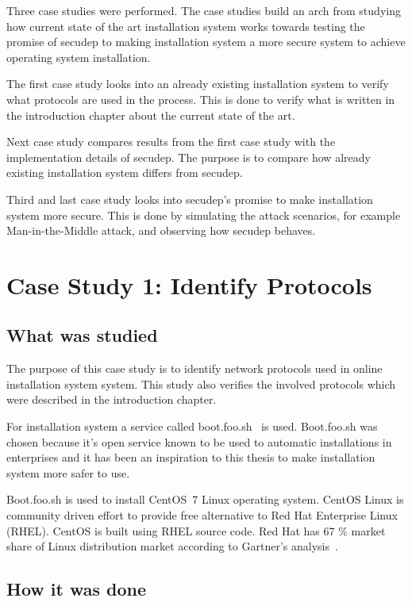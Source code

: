 
Three case studies were performed. The case studies build an arch from
studying how current state of the art installation system works
towards testing the promise of secudep to making installation system a
more secure system to achieve operating system installation.

The first case study looks into an already existing installation
system to verify what protocols are used in the process. This is done
to verify what is written in the introduction chapter about the
current state of the art.

Next case study compares results from the first case study with the
implementation details of secudep. The purpose is to compare how
already existing installation system differs from secudep.

Third and last case study looks into secudep's promise to make
installation system more secure. This is done by simulating the attack
scenarios, for example Man-in-the-Middle attack, and observing how
secudep behaves.


\section{Case Study 1: Identify Protocols}
\label{sec:casestudy1}

\subsection{What was studied}

The purpose of this case study is to identify network protocols used
in online installation system system. This study also verifies the
involved protocols which were described in the introduction chapter.

For installation system a service called
boot.foo.sh~\cite{boot-foo-sh} is used. Boot.foo.sh was chosen because
it's open service known to be used to automatic installations in
enterprises and it has been an inspiration to this thesis to make
installation system more safer to use.

Boot.foo.sh is used to install CentOS~7 Linux operating system. CentOS
Linux is community driven effort to provide free alternative to Red
Hat Enterprise Linux (RHEL). CentOS is built using RHEL source
code. Red Hat has 67 \% market share of Linux distribution market
according to Gartner's analysis~\cite{gartner-redhat}.

\subsection{How it was done}

